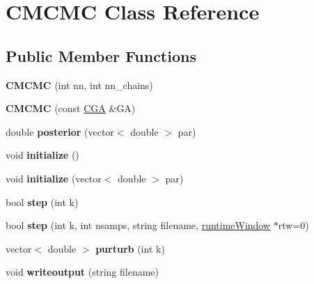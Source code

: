\hypertarget{class_c_m_c_m_c}{}\section{C\+M\+C\+MC Class Reference}
\label{class_c_m_c_m_c}
\subsection*{Public Member Functions}
\begin{DoxyCompactItemize}
\item 
\mbox{\label{class_c_m_c_m_c_ab33098c09592ba88a8e6cac964de71e4}} 
{\bfseries C\+M\+C\+MC} (int nn, int nn\+\_\+chains)
\item 
\mbox{\label{class_c_m_c_m_c_a26754db2c2abb17f66764053f76057bd}} 
{\bfseries C\+M\+C\+MC} (const \hyperlink{class_c_g_a}{C\+GA} \&GA)
\item 
\mbox{\label{class_c_m_c_m_c_aece456f64d68b1f23f2ac22ddce36df5}} 
double {\bfseries posterior} (vector$<$ double $>$ par)
\item 
\mbox{\label{class_c_m_c_m_c_ada7864a0c9a1a255b8cf039959f3d1e5}} 
void {\bfseries initialize} ()
\item 
\mbox{\label{class_c_m_c_m_c_afa5f206e83540e5da61909d783768c45}} 
void {\bfseries initialize} (vector$<$ double $>$ par)
\item 
\mbox{\label{class_c_m_c_m_c_af5d0dbdfa4e2b0925875a64cd0cb6566}} 
bool {\bfseries step} (int k)
\item 
\mbox{\label{class_c_m_c_m_c_adddde175f355fce03e76166caffd3fcd}} 
bool {\bfseries step} (int k, int nsamps, string filename, \hyperlink{classruntime_window}{runtime\+Window} $\ast$rtw=0)
\item 
\mbox{\label{class_c_m_c_m_c_a4868d8323680fb8f7fc606e4ca017002}} 
vector$<$ double $>$ {\bfseries purturb} (int k)
\item 
\mbox{\label{class_c_m_c_m_c_ac33df0dd00e27d01d951ab79004658cc}} 
void {\bfseries writeoutput} (string filename)

\end{DoxyCompactItemize}
